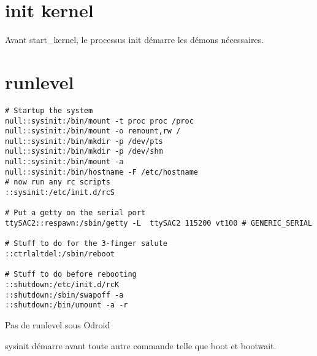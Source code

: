 \section{init kernel}
Avant start\_kernel, le processus init démarre les démons nécessaires. 

\section{runlevel}
\begin{lstlisting}[style=Bash]
# Startup the system
null::sysinit:/bin/mount -t proc proc /proc
null::sysinit:/bin/mount -o remount,rw /
null::sysinit:/bin/mkdir -p /dev/pts
null::sysinit:/bin/mkdir -p /dev/shm
null::sysinit:/bin/mount -a
null::sysinit:/bin/hostname -F /etc/hostname
# now run any rc scripts
::sysinit:/etc/init.d/rcS

# Put a getty on the serial port
ttySAC2::respawn:/sbin/getty -L  ttySAC2 115200 vt100 # GENERIC_SERIAL

# Stuff to do for the 3-finger salute
::ctrlaltdel:/sbin/reboot

# Stuff to do before rebooting
::shutdown:/etc/init.d/rcK
::shutdown:/sbin/swapoff -a
::shutdown:/bin/umount -a -r
\end{lstlisting}
Pas de runlevel sous Odroid

sysinit démarre avant toute autre commande telle que boot et bootwait.
